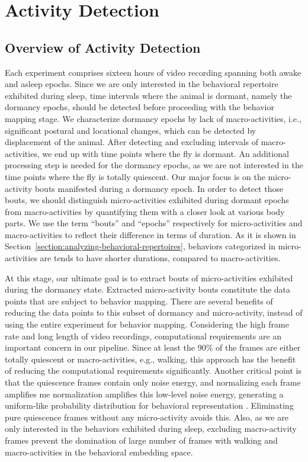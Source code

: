 \setlength{\parindent}{0pt}
\chapter{Activity Detection}
\section{Overview of Activity Detection}
Each experiment comprises sixteen hours of video recording spanning both awake and asleep epochs.
Since we are only interested in the behavioral repertoire exhibited during sleep, time intervals where the animal is dormant, namely the dormancy epochs, should be detected before proceeding with the behavior mapping stage.
We characterize dormancy epochs by lack of macro-activities, i.e., significant postural and locational changes, which can be detected by displacement of the animal.
After detecting and excluding intervals of macro-activities, we end up with time points where the fly is dormant.
An additional  processing step is needed for the dormancy epochs, as we are not interested in the time points where the fly is totally quiescent.
Our major focus is on the micro-activity bouts manifested during a dormancy epoch.
In order to detect those bouts, we should distinguish micro-activities exhibited during dormant epochs from macro-activities by quantifying them with a closer look at various body parts. We use the term ``bouts'' and ``epochs'' respectively for micro-activities and macro-activities to reflect their difference in terms of duration. As it is shown in Section~\ref{section:analyzing-behavioral-repertoires}, behaviors categorized in micro-activities are tends to have shorter durations, compared to macro-activities.

At this stage, our ultimate goal is to extract bouts of micro-activities exhibited during the dormancy state.
Extracted micro-activity bouts constitute the data points that are subject to behavior mapping.
There are several benefits of reducing the data points to this subset of dormancy and micro-activity, instead of using the entire experiment for behavior mapping.
Considering the high frame rate and long length of video recordings, computational requirements are an important concern in our pipeline.
Since  at least the $90\%$ of the frames are either totally quiescent or macro-activities, e.g., walking, this approach has the benefit of reducing the computational requirements significantly.
Another critical point is that the quiescence frames contain only noise energy, and normalizing each frame amplifies me normalization amplifies this low-level noise energy, generating a uniform-like probability distribution for behavioral representation \citep{todd_systematic_2017}.
Eliminating pure quiescence frames without any micro-activity avoids this.
Also, as we are only interested in the behaviors exhibited during sleep, excluding macro-activity frames prevent the domination of large number of frames with walking and macro-activities in the behavioral embedding space.

